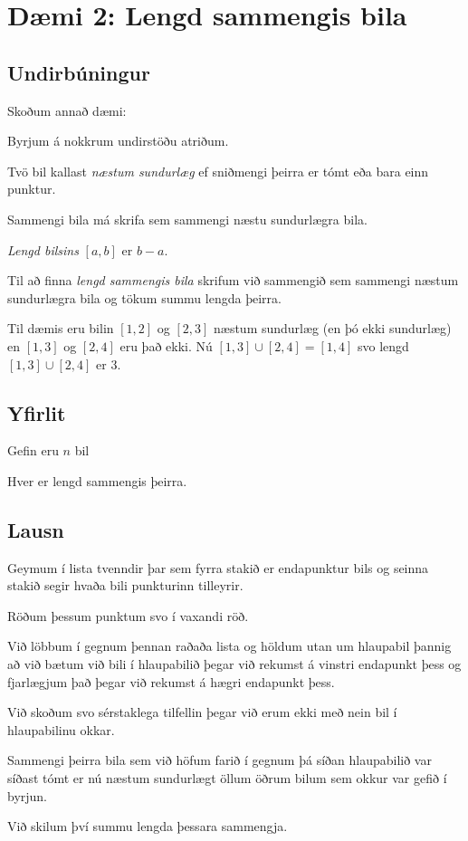 \section{Dæmi 2: Lengd sammengis bila}
\subsection{Undirbúningur}
{
    {
        \item<1-> Skoðum annað dæmi:
        \item<2-> Byrjum á nokkrum undirstöðu atriðum.
        \item<3-> Tvö bil kallast \emph{næstum sundurlæg} ef sniðmengi þeirra er tómt eða bara einn punktur.
        \item<4-> Sammengi bila má skrifa sem sammengi næstu sundurlægra bila.
        \item<5-> \emph{Lengd bilsins} $[a, b]$ er $b - a$.
        \item<6-> Til að finna \emph{lengd sammengis bila} skrifum við sammengið sem sammengi næstum sundurlægra bila
                    og tökum summu lengda þeirra.
        \item<7-> Til dæmis eru bilin $[1, 2]$ og $[2, 3]$ næstum sundurlæg (en þó ekki sundurlæg) en 
                    $[1, 3]$ og $[2, 4]$ eru það ekki. Nú $[1, 3] \cup [2, 4] = [1, 4]$ svo lengd $[1, 3] \cup [2, 4]$ er $3$.
    }
}

\subsection{Yfirlit}
{
    {
        \item<1-> Gefin eru $n$ bil
        \item<2-> Hver er lengd sammengis þeirra.
    }
}

\subsection{Lausn}
{
    {
        \item<1-> Geymum í lista tvenndir þar sem fyrra stakið er endapunktur bils og seinna stakið segir hvaða bili punkturinn tilleyrir.
        \item<2-> Röðum þessum punktum svo í vaxandi röð.
        \item<3-> Við löbbum í gegnum þennan raðaða lista og höldum utan um hlaupabil þannig að
                    við bætum við bili í hlaupabilið þegar við rekumst á vinstri endapunkt þess og fjarlægjum það 
                    þegar við rekumst á hægri endapunkt þess. 
        \item<4-> Við skoðum svo sérstaklega tilfellin þegar við erum ekki með nein bil í hlaupabilinu okkar.
        \item<5-> Sammengi þeirra bila sem við höfum farið í gegnum þá síðan hlaupabilið var síðast tómt er nú næstum
                    sundurlægt öllum öðrum bilum sem okkur var gefið í byrjun.
        \item<6-> Við skilum því summu lengda þessara sammengja.
    }
}

